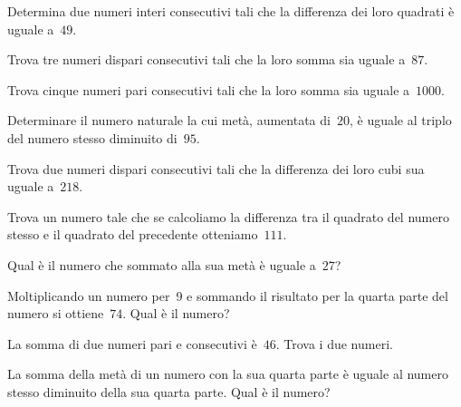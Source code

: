 \begin{multicols}{2}
\begin{esercizio}
\label{ese:16.29}
Determina due numeri interi consecutivi tali che la differenza dei loro quadrati è uguale a~$49$.
\end{esercizio}

\begin{esercizio}
\label{ese:16.30}
Trova tre numeri dispari consecutivi tali che la loro somma sia uguale a~$87$.
\end{esercizio}

\begin{esercizio}
\label{ese:16.31}
Trova cinque numeri pari consecutivi tali che la loro somma sia uguale a~$1000$.
\end{esercizio}

\begin{esercizio}[\Ast]
\label{ese:16.32}
Determinare il numero naturale la cui metà, aumentata di~$20$, è uguale al triplo del numero stesso diminuito di~$95$.
\end{esercizio}

\begin{esercizio}[\Ast]
\label{ese:16.33}
Trova due numeri dispari consecutivi tali che la differenza dei loro cubi sua uguale a~$218$.
\end{esercizio}

\begin{esercizio}[\Ast]
\label{ese:16.34}
Trova un numero tale che se calcoliamo la differenza tra il quadrato del numero stesso e il quadrato del precedente otteniamo~$111$.
\end{esercizio}

\begin{esercizio}
\label{ese:16.35}
Qual è il numero che sommato alla sua metà è uguale a~$27$?
\end{esercizio}

\begin{esercizio}[\Ast]
\label{ese:16.36}
Moltiplicando un numero per~9 e sommando il risultato per la quarta parte del numero si ottiene~$74$. Qual è il numero?
\end{esercizio}

\begin{esercizio}
\label{ese:16.37}
La somma di due numeri pari e consecutivi è~$46$. Trova i due numeri.
\end{esercizio}

\begin{esercizio}[\Ast]
\label{ese:16.38}
La somma della metà di un numero con la sua quarta parte è uguale al numero stesso diminuito della sua quarta parte. Qual è il numero?
\end{esercizio}


\end{multicols}
